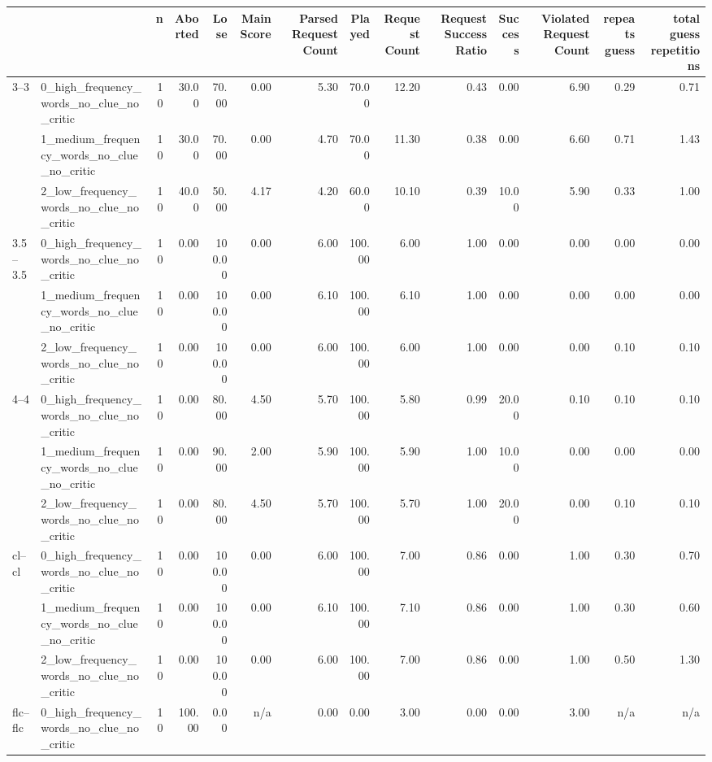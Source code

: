 \begin{tabular}{llrrrrrrrrrrrr}
\toprule
 &  & n & Aborted & Lose & Main Score & Parsed Request Count & Played & Request Count & Request Success Ratio & Success & Violated Request Count & repeats guess & total guess repetitions \\
\midrule
\multirow[t]{3}{*}{3--3} & 0_high_frequency_words_no_clue_no_critic & 10 & 30.00 & 70.00 & 0.00 & 5.30 & 70.00 & 12.20 & 0.43 & 0.00 & 6.90 & 0.29 & 0.71 \\
 & 1_medium_frequency_words_no_clue_no_critic & 10 & 30.00 & 70.00 & 0.00 & 4.70 & 70.00 & 11.30 & 0.38 & 0.00 & 6.60 & 0.71 & 1.43 \\
 & 2_low_frequency_words_no_clue_no_critic & 10 & 40.00 & 50.00 & 4.17 & 4.20 & 60.00 & 10.10 & 0.39 & 10.00 & 5.90 & 0.33 & 1.00 \\
\cline{1-14}
\multirow[t]{3}{*}{3.5--3.5} & 0_high_frequency_words_no_clue_no_critic & 10 & 0.00 & 100.00 & 0.00 & 6.00 & 100.00 & 6.00 & 1.00 & 0.00 & 0.00 & 0.00 & 0.00 \\
 & 1_medium_frequency_words_no_clue_no_critic & 10 & 0.00 & 100.00 & 0.00 & 6.10 & 100.00 & 6.10 & 1.00 & 0.00 & 0.00 & 0.00 & 0.00 \\
 & 2_low_frequency_words_no_clue_no_critic & 10 & 0.00 & 100.00 & 0.00 & 6.00 & 100.00 & 6.00 & 1.00 & 0.00 & 0.00 & 0.10 & 0.10 \\
\cline{1-14}
\multirow[t]{3}{*}{4--4} & 0_high_frequency_words_no_clue_no_critic & 10 & 0.00 & 80.00 & 4.50 & 5.70 & 100.00 & 5.80 & 0.99 & 20.00 & 0.10 & 0.10 & 0.10 \\
 & 1_medium_frequency_words_no_clue_no_critic & 10 & 0.00 & 90.00 & 2.00 & 5.90 & 100.00 & 5.90 & 1.00 & 10.00 & 0.00 & 0.00 & 0.00 \\
 & 2_low_frequency_words_no_clue_no_critic & 10 & 0.00 & 80.00 & 4.50 & 5.70 & 100.00 & 5.70 & 1.00 & 20.00 & 0.00 & 0.10 & 0.10 \\
\cline{1-14}
\multirow[t]{3}{*}{cl--cl} & 0_high_frequency_words_no_clue_no_critic & 10 & 0.00 & 100.00 & 0.00 & 6.00 & 100.00 & 7.00 & 0.86 & 0.00 & 1.00 & 0.30 & 0.70 \\
 & 1_medium_frequency_words_no_clue_no_critic & 10 & 0.00 & 100.00 & 0.00 & 6.10 & 100.00 & 7.10 & 0.86 & 0.00 & 1.00 & 0.30 & 0.60 \\
 & 2_low_frequency_words_no_clue_no_critic & 10 & 0.00 & 100.00 & 0.00 & 6.00 & 100.00 & 7.00 & 0.86 & 0.00 & 1.00 & 0.50 & 1.30 \\
\cline{1-14}
\multirow[t]{3}{*}{flc--flc} & 0_high_frequency_words_no_clue_no_critic & 10 & 100.00 & 0.00 & n/a & 0.00 & 0.00 & 3.00 & 0.00 & 0.00 & 3.00 & n/a & n/a \\

\end{tabular}

